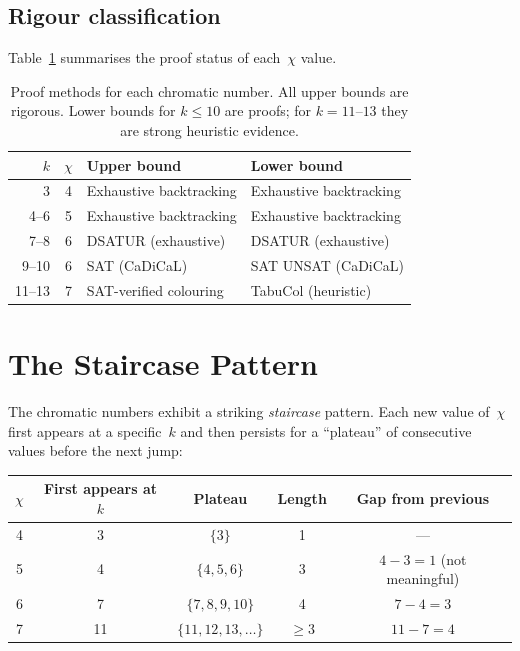 \documentclass[12pt]{article}
\theoremstyle{definition}
\theoremstyle{remark}
\begin{document}
\subsection{Rigour classification}

Table~\ref{tab:rigour} summarises the proof status of each~$\chi$ value.

\begin{table}[h]
\centering
\begin{tabular}{@{}rcll@{}}
\toprule
$k$ & $\chi$ & Upper bound & Lower bound \\
\midrule
3       & 4 & Exhaustive backtracking & Exhaustive backtracking \\
4--6    & 5 & Exhaustive backtracking & Exhaustive backtracking \\
7--8    & 6 & DSATUR (exhaustive) & DSATUR (exhaustive) \\
9--10   & 6 & SAT (CaDiCaL) & SAT UNSAT (CaDiCaL) \\
11--13  & 7 & SAT-verified colouring & TabuCol (heuristic) \\
\bottomrule
\end{tabular}
\caption{Proof methods for each chromatic number.  All upper bounds are
rigorous.  Lower bounds for $k \le 10$ are proofs; for $k = 11$--$13$
they are strong heuristic evidence.}
\label{tab:rigour}
\end{table}


\section{The Staircase Pattern}
\label{sec:staircase}

The chromatic numbers exhibit a striking \emph{staircase} pattern.
Each new value of~$\chi$ first appears at a specific~$k$ and then persists
for a ``plateau'' of consecutive values before the next jump:

\begin{center}
\begin{tabular}{@{}ccccc@{}}
\toprule
$\chi$ & First appears at $k$ & Plateau & Length & Gap from previous \\
\midrule
4 & 3  & $\{3\}$        & 1  & --- \\
5 & 4  & $\{4,5,6\}$    & 3  & $4 - 3 = 1$ (not meaningful) \\
6 & 7  & $\{7,8,9,10\}$ & 4  & $7 - 4 = 3$ \\
7 & 11 & $\{11,12,13,\ldots\}$ & $\ge 3$ & $11 - 7 = 4$ \\
\bottomrule
\end{tabular}
\end{center}
\end{document}
